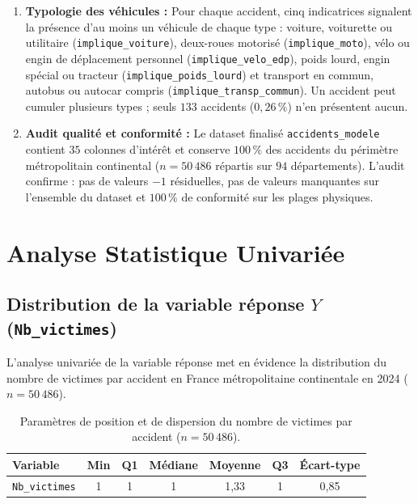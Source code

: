 \documentclass[11pt,a4paper]{article}
\begin{document}
\begin{enumerate}
    \item \textbf{Typologie des véhicules :}
    Pour chaque accident, cinq indicatrices signalent la présence d'au moins un véhicule de chaque type : voiture, voiturette ou utilitaire (\texttt{implique\_voiture}), deux-roues motorisé (\texttt{implique\_moto}), vélo ou engin de déplacement personnel (\texttt{implique\_velo\_edp}), poids lourd, engin spécial ou tracteur (\texttt{implique\_poids\_lourd}) et transport en commun, autobus ou autocar compris (\texttt{implique\_transp\_commun}). Un accident peut cumuler plusieurs types ; seuls $133$ accidents ($0{,}26\,\%$) n'en présentent aucun.

    \item \textbf{Audit qualité et conformité :}
    Le dataset finalisé \texttt{accidents\_modele} contient $35$ colonnes d'intérêt et conserve $100\,\%$ des accidents du périmètre métropolitain continental ($n = 50\,486$ répartis sur $94$ départements). L'audit confirme : pas de valeurs $-1$ résiduelles, pas de valeurs manquantes sur l'ensemble du dataset et $100\,\%$ de conformité sur les plages physiques.
\end{enumerate}


\section{Analyse Statistique Univariée}

\subsection{Distribution de la variable réponse $Y$ (\texttt{Nb\_victimes})}

L'analyse univariée de la variable réponse met en évidence la distribution du nombre de victimes par accident en France métropolitaine continentale en 2024 ($n = 50\,486$).

\begin{table}[H]
\centering
\small
\begin{tabularx}{0.95\linewidth}{Xcccccc}
\toprule
\textbf{Variable} & \textbf{Min} & \textbf{Q1} & \textbf{Médiane} & \textbf{Moyenne} & \textbf{Q3} & \textbf{Écart-type} \\
\midrule
\texttt{Nb\_victimes} & 1 & 1 & 1 & 1,33 & 1 & 0,85 \\
\bottomrule
\end{tabularx}
\caption{Paramètres de position et de dispersion du nombre de victimes par accident ($n = 50\,486$).}
\label{tab:univ_y}
\end{table}
\end{document}
